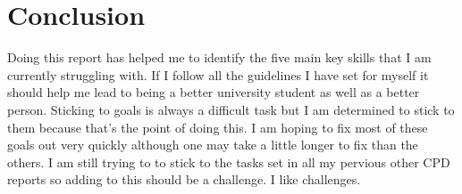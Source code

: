 \documentclass{scrartcl}
\begin{document}
\section*{Conclusion}
Doing this report has helped me to identify the five main key skills that I am currently struggling with. If I follow all the guidelines I have set for myself it should help me lead to being a better university student as well as a better person. Sticking to goals is always a difficult task but I am determined to stick to them because that's the point of doing this. I am hoping to fix most of these goals out very quickly although one may take a little longer to fix than the others. I am still trying to to stick to the tasks set in all my pervious other CPD reports so adding to this should be a challenge. I like challenges.




\end{document}
